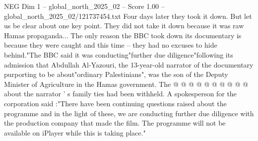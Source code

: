\begin{textsample}{NEG Dim 1 – global\_north\_2025\_02 – Score 1.00 – global\_north\_2025\_02/121737454.txt}
Four days later they took it down.
But let us be clear about one key point.
They did not take it down because it was raw Hamas propaganda...
The only reason the BBC took down its documentary is because they were caught and this time -- they had no excuses to hide behind."The BBC said it was conducting"further due diligence"following its admission that Abdullah Al-Yazouri, the 13-year-old narrator of the documentary purporting to be about"ordinary Palestinians", was the son of the Deputy Minister of Agriculture in the Hamas government.
The @ @ @ @ @ @ @ @ @ @ about the narrator ' s family ties had been withheld.
A spokesperson for the corporation said :"There have been continuing questions raised about the programme and in the light of these, we are conducting further due diligence with the production company that made the film.
The programme will not be available on iPlayer while this is taking place."

\end{textsample}
